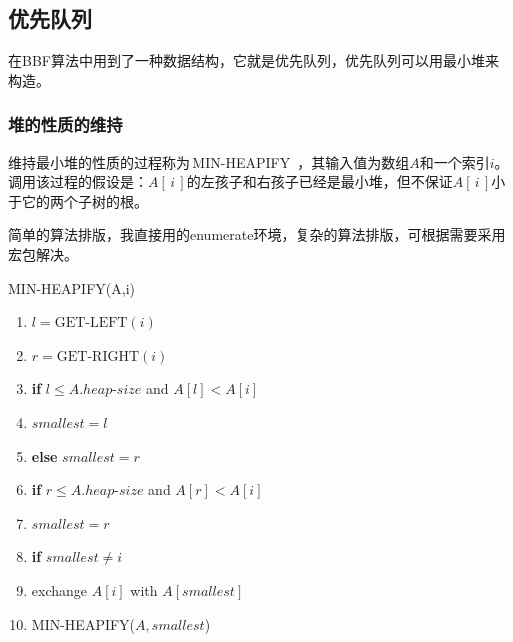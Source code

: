 \documentclass[10.5pt,a4paper]{article}
\numberwithin{equation}{section}
\numberwithin{figure}{section}
\numberwithin{table}{section}
\begin{document}
\subsection{优先队列}
在BBF算法中用到了一种数据结构，它就是优先队列，优先队列可以用最小堆来构造\cite{cormen2009introduction}。
\subsubsection{堆的性质的维持}
维持最小堆的性质的过程称为\,MIN-HEAPIFY\ ，其输入值为数组$A$和一个索引$i$。调用该过程的假设是：$A[\,i\,]$的左孩子和右孩子已经是最小堆，但不保证$A[\,i\,]$小于它的两个子树的根。\par
简单的算法排版，我直接用的enumerate环境，复杂的算法排版，可根据需要采用宏包解决。\par
\noindent
MIN-HEAPIFY(A,i)
\begin{enumerate}
\item $l = \text{GET-LEFT}(i) $
\item $r = \text{GET-RIGHT}(i) $
\item {\bf if} $l \le A.heap\text{-}size$ and $A[l] < A[i]$
\item \hspace{2em} $smallest = l$
\item {\bf else} $smallest = r$
\item {\bf if} $r \le A.heap\text{-}size$ and $A[r] < A[i]$
\item \hspace{2em}  $smallest = r$
\item {\bf if} $smallest \ne i$
\item exchange $A[i]$ with $A[smallest]$
\item MIN-HEAPIFY($A, smallest$)
\end{enumerate}
\newpage
\end{document}
